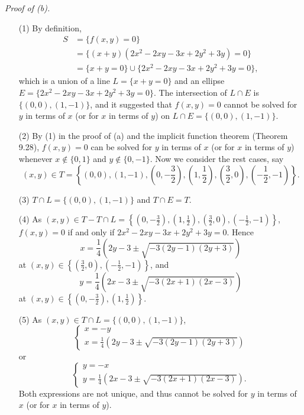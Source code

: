 \documentclass{article}
\begin{document}
\emph{Proof of (b).}
\begin{enumerate}
\item[(1)]
  By definition,
  \begin{align*}
    S
    &= \{ f(x,y) = 0 \} \\
    &= \{ (x+y)(2x^2-2xy-3x+2y^2+3y) = 0 \} \\
    &= \{ x+y = 0 \} \cup \{ 2x^2-2xy-3x+2y^2+3y = 0 \},
  \end{align*}
  which is a union of a line $L = \{ x+y = 0 \}$
  and an ellipse $E = \{ 2x^2-2xy-3x+2y^2+3y = 0 \}$.
  The intersection of $L \cap E$ is $\{ (0,0), (1,-1) \}$,
  and it suggested that $f(x,y) = 0$ cannot be solved for $y$ in terms of $x$
  (or for $x$ in terms of $y$) on $L \cap E = \{ (0,0), (1,-1) \}$.

\item[(2)]
  By (1) in the proof of (a) and the implicit function theorem (Theorem 9.28),
  $f(x,y) = 0$ can be solved for $y$ in terms of $x$ (or for $x$ in terms of $y$)
  whenever $x \not\in \{0,1\}$ and $y \not\in \{0,-1\}$.
  Now we consider the rest cases, say
  \[
    (x,y) \in T = \left\{
      (0,0),
      (1,-1),
      \left(0,-\frac{3}{2}\right),
      \left(1,\frac{1}{2}\right),
      \left(\frac{3}{2},0\right),
      \left(-\frac{1}{2}, -1\right)
    \right\}.
  \]

\item[(3)]
  $T \cap L = \{(0,0), (1,-1)\}$ and $T \cap E = T$.


\item[(4)]
  As $(x,y) \in T - T \cap L = \left\{
    \left(0,-\frac{3}{2}\right),
    \left(1,\frac{1}{2}\right),
    \left(\frac{3}{2},0\right),
    \left(-\frac{1}{2}, -1\right)
  \right\}$,
  $f(x,y) = 0$ if and only if $2x^2-2xy-3x+2y^2+3y = 0$.
  Hence
  \[
    x = \frac{1}{4}\left( 2y-3 \pm \sqrt{-3(2y-1)(2y+3)} \right)
  \]
  at $(x,y) \in \left\{\left(\frac{3}{2},0\right), \left(-\frac{1}{2}, -1\right)\right\}$,
  and
  \[
    y = \frac{1}{4}\left( 2x-3 \pm \sqrt{-3(2x+1)(2x-3)} \right)
  \]
  at $(x,y) \in \left\{\left(0,-\frac{3}{2}\right), \left(1,\frac{1}{2}\right)\right\}$.

\item[(5)]
  As $(x,y) \in T \cap L = \{(0,0), (1,-1)\}$,
  \begin{equation*}
    \begin{cases}
      x = -y \\
      x = \frac{1}{4}\left( 2y-3 \pm \sqrt{-3(2y-1)(2y+3)} \right)
    \end{cases}
  \end{equation*}
  or
  \begin{equation*}
    \begin{cases}
      y = -x \\
      y = \frac{1}{4}\left( 2x-3 \pm \sqrt{-3(2x+1)(2x-3)} \right).
    \end{cases}
  \end{equation*}
  Both expressions are not unique, and thus cannot be solved
  for $y$ in terms of $x$ (or for $x$ in terms of $y$).
\end{enumerate}
\end{document}
